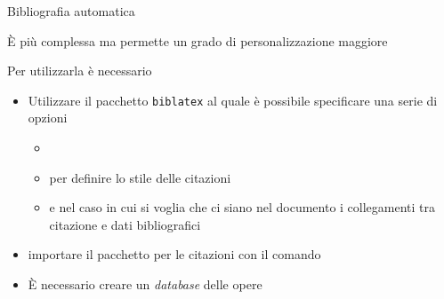 \begin{frame}[fragile]{Bibliografia automatica}

È più complessa ma permette un grado di personalizzazione maggiore

\vfill

Per utilizzarla è necessario
\begin{itemize}
	\item Utilizzare il pacchetto \texttt{biblatex} al quale è possibile specificare una serie di opzioni
	\begin{itemize}
		\item {}
		\item {} per definire lo stile delle citazioni
		\item {} e  nel caso in cui si voglia che ci siano nel documento i collegamenti tra citazione e dati bibliografici
	\end{itemize}
	\item importare il pacchetto per le citazioni con il comando 
	\inline{\usepackage[autostyle,italian=guillemets]{csquotes}}
	\item È necessario creare un \emph{database} delle opere
\end{itemize}

\end{frame}
